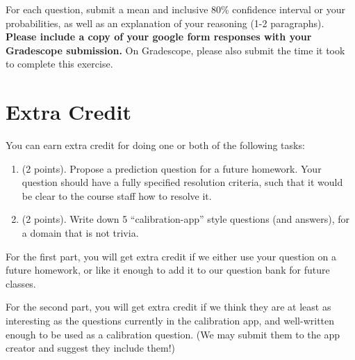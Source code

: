 \documentclass[11pt]{article}
\begin{document}
For each question, submit a mean and inclusive 80\% confidence interval or your probabilities, as well as an explanation of your reasoning (1-2 paragraphs). \textbf{Please include a copy of your google form responses with your Gradescope submission.} On Gradescope, please also submit the time it took to complete this exercise.

\section*{Extra Credit}

You can earn extra credit for doing one or both of the following tasks:
\begin{enumerate}
\item (2 points). Propose a prediction question for a future homework. Your question should have a fully specified resolution criteria, 
      such that it would be clear to the course staff how to resolve it.
\item (2 points). Write down 5 ``calibration-app'' style questions (and answers), for a domain that is not trivia.
\end{enumerate}

For the first part, you will get extra credit if we either use your question on a future homework, 
or like it enough to add it to our question bank for future classes.

For the second part, you will get extra credit if we think they are at least as interesting as the 
questions currently in the calibration app, and well-written enough to be used as a calibration question. 
(We may submit them to the app creator and suggest they include them!)
\end{document}
